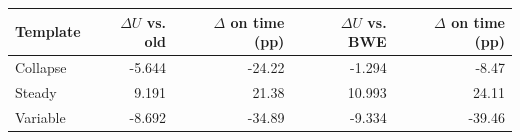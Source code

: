 \begin{tabular}{lrrrr}
\toprule
Template & $\Delta U$ vs. old & $\Delta$ on time (pp) & $\Delta U$ vs. BWE & $\Delta$ on time (pp)\\
\midrule
Collapse & -5.644 & -24.22 & -1.294 & -8.47\\
Steady & 9.191 & 21.38 & 10.993 & 24.11\\
Variable & -8.692 & -34.89 & -9.334 & -39.46\\
\bottomrule
\end{tabular}
